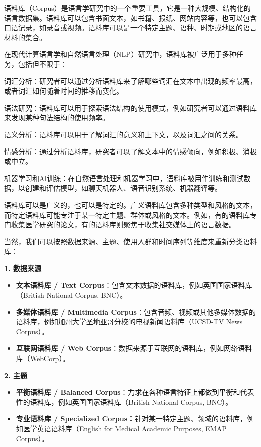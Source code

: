 \documentclass[]{book}
\begin{document}
语料库（Corpus）是语言学研究中的一个重要工具，它是一种大规模、结构化的语言数据集。语料库可以包含书面文本，如书籍、报纸、网站内容等，也可以包含口语记录，如录音或视频。语料库可以是一个特定主题、语种、时期或地区的语言材料的集合。

在现代计算语言学和自然语言处理（NLP）研究中，语料库被广泛用于多种任务，包括但不限于：

词汇分析：研究者可以通过分析语料库来了解哪些词汇在文本中出现的频率最高，或者词汇如何随着时间的推移而变化。

语法研究：语料库可以用于探索语法结构的使用模式，例如研究者可以通过语料库来发现某种句法结构的使用频率。

语义分析：语料库可以用于了解词汇的意义和上下文，以及词汇之间的关系。

情感分析：通过分析语料库，研究者可以了解文本中的情感倾向，例如积极、消极或中立。

机器学习和AI训练：在自然语言处理和机器学习中，语料库被用作训练和测试数据，以创建和评估模型，如聊天机器人、语音识别系统、机器翻译等。

语料库可以是广义的，也可以是特定的。广义语料库包含多种类型和风格的文本，而特定语料库可能专注于某一特定主题、群体或风格的文本。例如，有的语料库专门收集医学研究的论文，有的语料库则聚焦于收集社交媒体上的语言数据。

当然，我们可以按照数据来源、主题、使用人群和时间序列等维度来重新分类语料库：

\textbf{1. 数据来源}

\begin{itemize}
\item
  \textbf{文本语料库 / Text Corpus}：包含文本数据的语料库，例如英国国家语料库（British National Corpus, BNC）。
\item
  \textbf{多媒体语料库 / Multimedia Corpus}：包含音频、视频或其他多媒体数据的语料库，例如加州大学圣地亚哥分校的电视新闻语料库（UCSD-TV News Corpus）。
\item
  \textbf{互联网语料库 / Web Corpus}：数据来源于互联网的语料库，例如网络语料库（WebCorp）。
\end{itemize}

\textbf{2. 主题}

\begin{itemize}
\item
  \textbf{平衡语料库 / Balanced Corpus}：力求在各种语言特征上都做到平衡和代表性的语料库，例如英国国家语料库（British National Corpus, BNC）。
\item
  \textbf{专业语料库 / Specialized Corpus}：针对某一特定主题、领域的语料库，例如医学英语语料库（English for Medical Academic Purposes, EMAP Corpus）。
\end{itemize}
\end{document}
